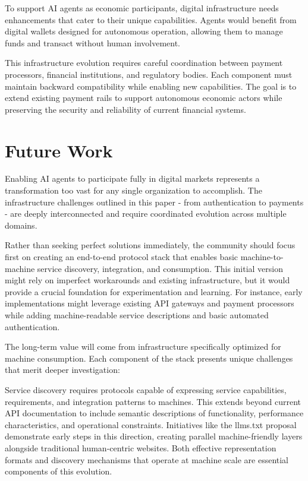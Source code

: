 \documentclass{article}
\begin{document}
To support AI agents as economic participants, digital infrastructure needs enhancements that cater to their unique capabilities. Agents would benefit from digital wallets designed for autonomous operation, allowing them to manage funds and transact without human involvement.

This infrastructure evolution requires careful coordination between payment processors, financial institutions, and regulatory bodies. Each component must maintain backward compatibility while enabling new capabilities. The goal is to extend existing payment rails to support autonomous economic actors while preserving the security and reliability of current financial systems.


\section{Future Work}
\label{sec:future_work}
Enabling AI agents to participate fully in digital markets represents a transformation too vast for any single organization to accomplish. The infrastructure challenges outlined in this paper - from authentication to payments - are deeply interconnected and require coordinated evolution across multiple domains.

Rather than seeking perfect solutions immediately, the community should focus first on creating an end-to-end protocol stack that enables basic machine-to-machine service discovery, integration, and consumption. This initial version might rely on imperfect workarounds and existing infrastructure, but it would provide a crucial foundation for experimentation and learning. For instance, early implementations might leverage existing API gateways and payment processors while adding machine-readable service descriptions and basic automated authentication.

The long-term value will come from infrastructure specifically optimized for machine consumption. Each component of the stack presents unique challenges that merit deeper investigation:

Service discovery requires protocols capable of expressing service capabilities, requirements, and integration patterns to machines. This extends beyond current API documentation to include semantic descriptions of functionality, performance characteristics, and operational constraints. Initiatives like the llms.txt proposal demonstrate early steps in this direction, creating parallel machine-friendly layers alongside traditional human-centric websites. Both effective representation formats and discovery mechanisms that operate at machine scale are essential components of this evolution.
\end{document}
